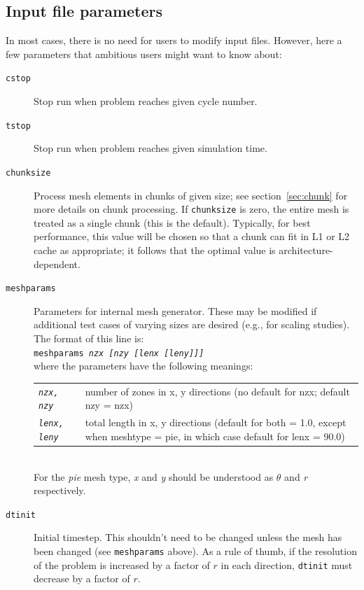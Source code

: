 \documentclass[11pt,letterpaper]{article}
\begin{document}
\subsection{Input file parameters}

In most cases, there is no need for users to modify input files.  However,
here a few parameters that ambitious users might want to know about:
\begin{description}
    \item[{\tt cstop}]  Stop run when problem reaches given cycle number.
    \item[{\tt tstop}]  Stop run when problem reaches given simulation time.
    \item[{\tt chunksize}]  Process mesh elements in chunks of given size;
        see section~\ref{sec:chunk} for more details on chunk processing.
        If {\tt chunksize} is zero, the entire mesh is
        treated as a single chunk (this is the default).
        Typically, for best performance, this value will be chosen so
        that a chunk can fit in L1 or L2 cache as appropriate; it
        follows that the optimal value is architecture-dependent.
    \item[{\tt meshparams}]  Parameters for internal mesh generator.
        These may be modified if additional test cases of varying sizes are
        desired (e.g., for scaling studies).  The format of this line
        is: \\
        {\tt meshparams \emph{nzx [nzy [lenx [leny]]]}} \\
        where the parameters have the following meanings: \\
        \begin{tabular}{lp{320pt}}
            {\tt\emph{nzx, nzy}} &
            number of zones in x, y directions
            (no default for nzx; default nzy = nzx) \\
            {\tt\emph{lenx, leny}} &
            total length in x, y directions
            (default for both = 1.0, except when meshtype = pie,
            in which case default for lenx = 90.0)
        \end{tabular} \\
        For the {\em pie} mesh type, {\em x} and {\em y}
        should be understood as $\theta$ and {\em r} respectively.
    \item[{\tt dtinit}]  Initial timestep.  This shouldn't need to be
        changed unless the mesh has been changed (see
        {\tt meshparams} above).  As a rule of thumb, if the resolution
        of the problem is increased by a factor of $r$ in each direction,
        {\tt dtinit} must decrease by a factor of $r$.
\end{description}
\end{document}
